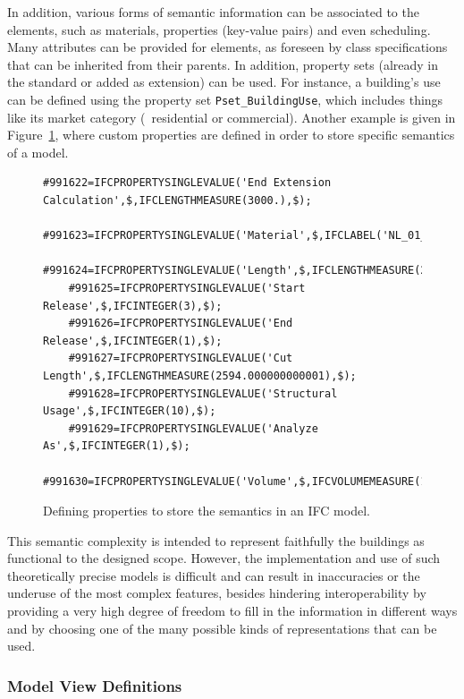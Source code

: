 In addition, various forms of semantic information can be associated to the elements, such as materials, properties (key-value pairs) and even scheduling.
Many attributes can be provided for elements, as foreseen by class specifications that can be inherited from their parents.
In addition, property sets (already in the standard or added as extension) can be used.
For instance, a building's use can be defined using the property set \texttt{Pset\_BuildingUse}, which includes things like its market category (\eg\ residential or commercial).
Another example is given in Figure~\ref{fig:pset}, where custom properties are defined in order to store specific semantics of a model.

\begin{figure}
	\begin{lstlisting}[frame=single]
	#991622=IFCPROPERTYSINGLEVALUE('End Extension Calculation',$,IFCLENGTHMEASURE(3000.),$);
	#991623=IFCPROPERTYSINGLEVALUE('Material',$,IFCLABEL('NL_01_hout_plaat'),$);
	#991624=IFCPROPERTYSINGLEVALUE('Length',$,IFCLENGTHMEASURE(2594.),$);
	#991625=IFCPROPERTYSINGLEVALUE('Start Release',$,IFCINTEGER(3),$);
	#991626=IFCPROPERTYSINGLEVALUE('End Release',$,IFCINTEGER(1),$);
	#991627=IFCPROPERTYSINGLEVALUE('Cut Length',$,IFCLENGTHMEASURE(2594.000000000001),$);
	#991628=IFCPROPERTYSINGLEVALUE('Structural Usage',$,IFCINTEGER(10),$);
	#991629=IFCPROPERTYSINGLEVALUE('Analyze As',$,IFCINTEGER(1),$);
	#991630=IFCPROPERTYSINGLEVALUE('Volume',$,IFCVOLUMEMEASURE(13602936.00000029),$);
	\end{lstlisting}
	\caption{Defining properties to store the semantics in an IFC model.}%
	\label{fig:pset}
\end{figure}


This semantic complexity is intended to represent faithfully the buildings as functional to the designed scope.
However, the implementation and use of such theoretically precise models is difficult and can result in inaccuracies or the underuse of the most complex features, besides hindering interoperability by providing a very high degree of freedom to fill in the information in different ways and by choosing one of the many possible kinds of representations that can be used.


\subsubsection{Model View Definitions}

